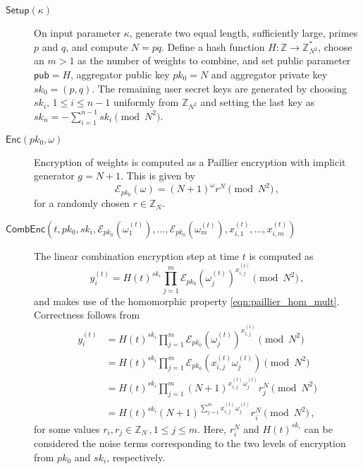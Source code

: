 \documentclass[twocolumn]{autart}
\begin{document}
\begin{description}
    \item[$\mathsf{Setup}(\kappa)$] On input parameter $\kappa$, generate two equal length, sufficiently large, primes $p$ and $q$, and compute $N=pq$. Define a hash function $H:\mathbb{Z} \rightarrow \mathbb{Z}_{N^2}^*$, choose an $m>1$ as the number of weights to combine, and set public parameter $\mathsf{pub}=H$, aggregator public key $pk_0 = N$ and aggregator private key $sk_0=(p,q)$. The remaining user secret keys are generated by choosing $sk_i,\,1\leq i\leq n-1$ uniformly from $\mathbb{Z}_{N^2}$ and setting the last key as $sk_n = -\sum^{n-1}_{i=1}sk_i \pmod{N^2}$.
 
    \item[$\mathsf{Enc}(pk_0, \omega)$] Encryption of weights is computed as a Paillier encryption with implicit generator $g=N+1$. This is given by
    \begin{equation}
        \mathcal{E}_{pk_0}(\omega) = (N+1)^{\omega}r^N \pmod{N^2}\,, \label{eqn:our_scheme_encrypt}
    \end{equation}
    for a randomly chosen $r \in \mathbb{Z}_N$.

    \item[$\mathsf{CombEnc}(t, pk_0, sk_i, \mathcal{E}_{pk_0}(\omega_1^{(t)}),\dots,\mathcal{E}_{pk_0}(\omega_m^{(t)}), x^{(t)}_{i,1},\dots,x^{(t)}_{i,m})$] The linear combination encryption step at time $t$ is computed as 
    \begin{equation}
        y^{(t)}_i = H(t)^{sk_i}\prod^{m}_{j=1}\mathcal{E}_{pk_0}(\omega^{(t)}_j)^{x^{(t)}_{i,j}} \pmod{N^2}\,,\label{eqn:our_scheme_lin_comb}
    \end{equation}
    and makes use of the homomorphic property \eqref{eqn:paillier_hom_mult}. Correctness follows from
    \begin{equation*}
        \begin{split}
             y^{(t)}_i &= H(t)^{sk_i}\prod^{m}_{j=1}\mathcal{E}_{pk_0}(\omega^{(t)}_j)^{x^{(t)}_{i,j}} \pmod{N^2} \\
            &= H(t)^{sk_i}\prod^{m}_{j=1}\mathcal{E}_{pk_0}(x^{(t)}_{i,j}\omega^{(t)}_j) \pmod{N^2} \\
            &= H(t)^{sk_i}\prod^{m}_{j=1}(N+1)^{x^{(t)}_{i,j}\omega^{(t)}_j} r^{N}_{j} \pmod{N^2} \\
            &= H(t)^{sk_i}(N+1)^{\sum^{m}_{j=1}x^{(t)}_{i,j}\omega^{(t)}_j} r_{i}^{N} \pmod{N^2}\,,
        \end{split}
    \end{equation*}
    for some values $r_i,r_j \in \mathbb{Z}_N\,,1\leq j \leq m$. Here, $r_i^N$ and $H(t)^{sk_i}$ can be considered the noise terms corresponding to the two levels of encryption from $pk_0$ and $sk_i$, respectively.


\end{description}
\end{document}
